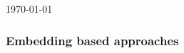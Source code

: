 \documentclass{article}
\begin{document}
\today
\tableofcontents

\subsubsection*{Embedding based approaches}
\end{document}
